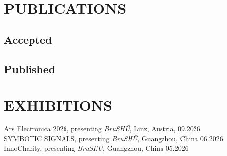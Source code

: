

\section*{PUBLICATIONS}

\nocite{*} %

\subsection*{Accepted}
\printbibliography[filter=accepted,heading=none,resetnumbers=true]

\subsection*{Published}
\printbibliography[filter=published,heading=none,resetnumbers=true]


\section{EXHIBITIONS}
\href{https://ars.electronica.art/negotiatinghumanity/en/view/brushu-38238ddb450c814c8b2eef5e8757151e/}{Ars Electronica 2026}, presenting \href{https://ars.electronica.art/negotiatinghumanity/en/notion/brushu/}{\textit{BruSHŪ}}, Linz, Austria, \hfill 09.2026\\
SYMBOTIC SIGNALS, presenting \textit{BruSHŪ}, Guangzhou, China \hfill 06.2026\\
InnoCharity, presenting \textit{BruSHŪ}, Guangzhou, China \hfill 05.2026\\
